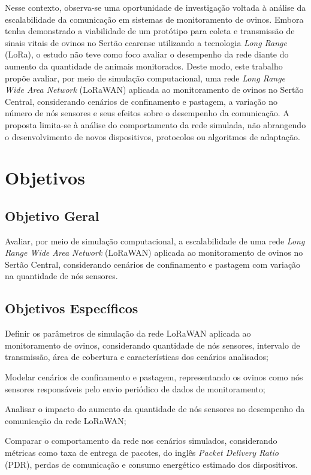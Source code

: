 Nesse contexto, observa-se uma oportunidade de investigação voltada à análise da escalabilidade da comunicação em sistemas de monitoramento de ovinos. Embora  tenha demonstrado a viabilidade de um protótipo para coleta e transmissão de sinais vitais de ovinos no Sertão cearense utilizando a tecnologia \textit{Long Range} (LoRa), o estudo não teve como foco avaliar o desempenho da rede diante do aumento da quantidade de animais monitorados. Deste modo, este trabalho propõe avaliar, por meio de simulação computacional, uma rede \textit{Long Range Wide Area Network} (LoRaWAN) aplicada ao monitoramento de ovinos no Sertão Central, considerando cenários de confinamento e pastagem, a variação no número de nós sensores e seus efeitos sobre o desempenho da comunicação. A proposta limita-se à análise do comportamento da rede simulada, não abrangendo o desenvolvimento de novos dispositivos, protocolos ou algoritmos de adaptação.


\section{Objetivos}
\label{cap:objetivos}

\subsection{Objetivo Geral}
\label{sec:objetivo-geral}

Avaliar, por meio de simulação computacional, a escalabilidade de uma rede \textit{Long Range Wide Area Network} (LoRaWAN) aplicada ao monitoramento de ovinos no Sertão Central, considerando cenários de confinamento e pastagem com variação na quantidade de nós sensores.

\subsection{Objetivos Específicos}
\label{sec:objetivos-especificos}

\begin{alineas}
    \item Definir os parâmetros de simulação da rede LoRaWAN aplicada ao monitoramento de ovinos, considerando quantidade de nós sensores, intervalo de transmissão, área de cobertura e características dos cenários analisados;

    \item Modelar cenários de confinamento e pastagem, representando os ovinos como nós sensores responsáveis pelo envio periódico de dados de monitoramento;

    \item Analisar o impacto do aumento da quantidade de nós sensores no desempenho da comunicação da rede LoRaWAN;

    \item Comparar o comportamento da rede nos cenários simulados, considerando métricas como taxa de entrega de pacotes, do inglês \textit{Packet Delivery Ratio} (PDR), perdas de comunicação e consumo energético estimado dos dispositivos.
\end{alineas}